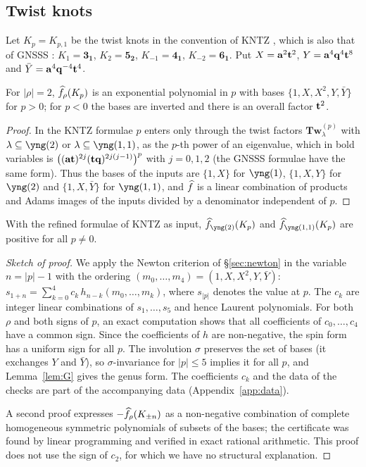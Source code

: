 \subsection{Twist knots}
Let $K_p=K_{p,1}$ be the twist knots in the convention of KNTZ \cite{Kameyama19}, which is also that of GNSSS \cite{Gukov15}:
$K_1=\mathbf{3_1}$, $K_2=\mathbf{5_2}$, $K_{-1}=\mathbf{4_1}$, $K_{-2}=\mathbf{6_1}$.
Put $X=\mathbf{a}^2\mathbf{t}^2$, $Y=\mathbf{a}^4\mathbf{q}^4\mathbf{t}^8$ and $\bar Y=\mathbf{a}^4\mathbf{q}^{-4}\mathbf{t}^4$.
\begin{lemma}\label{lem:twist-expsum}
For $|\rho|=2$, $\widehat{f}_\rho(K_p)$ is an exponential polynomial in $p$ with bases $\{1,X,X^2,Y,\bar Y\}$ for $p>0$;
for $p<0$ the bases are inverted and there is an overall factor $\mathbf{t}^2$.
\end{lemma}
\begin{proof}
In the KNTZ formulae $p$ enters only through the twist factors $\mathbf{Tw}^{(p)}_\lambda$ with $\lambda\subseteq\yng(2)$ or $\lambda\subseteq\yng(1,1)$, as the $p$-th power of an eigenvalue,
which in bold variables is $\bigl((\mathbf{a}\mathbf{t})^{2j}(\mathbf{t}\mathbf{q})^{2j(j-1)}\bigr)^p$ with $j=0,1,2$ (the GNSSS formulae have the same form).
Thus the bases of the inputs are $\{1,X\}$ for $\yng(1)$, $\{1,X,Y\}$ for $\yng(2)$ and $\{1,X,\bar Y\}$ for $\yng(1,1)$,
and $\widehat{f}$ is a linear combination of products and Adams images of the inputs divided by a denominator independent of $p$.
\end{proof}
\begin{theorem}\label{thm:twist}
With the refined formulae of KNTZ as input, $\hf_{\yng(2)}(K_p)$ and $\hf_{\yng(1,1)}(K_p)$ are positive for all $p\neq0$.
\end{theorem}
\begin{proof}[Sketch of proof]
We apply the Newton criterion of \S\ref{sec:newton} in the variable $n=|p|-1$ with the ordering $(m_0,\dots,m_4)=(1,X,X^2,Y,\bar Y)$:
$s_{1+n}=\sum_{k=0}^{4}c_k\,h_{n-k}(m_0,\dots,m_k)$, where $s_{|p|}$ denotes the value at $p$.
The $c_k$ are integer linear combinations of $s_1,\dots,s_5$ and hence Laurent polynomials.
For both $\rho$ and both signs of $p$, an exact computation shows that all coefficients of $c_0,\dots,c_4$ have a common sign.
Since the coefficients of $h$ are non-negative, the spin form has a uniform sign for all $p$.
The involution $\sigma$ preserves the set of bases (it exchanges $Y$ and $\bar Y$), so $\sigma$-invariance for $|p|\le5$ implies it for all $p$, and Lemma~\ref{lem:G} gives the genus form.
The coefficients $c_k$ and the data of the checks are part of the accompanying data (Appendix~\ref{app:data}).

A second proof expresses $-\widehat{f}_\rho(K_{\pm n})$ as a non-negative combination of complete homogeneous symmetric polynomials of subsets of the bases;
the certificate was found by linear programming and verified in exact rational arithmetic. This proof does not use the sign of $c_2$, for which we have no structural explanation.
\end{proof}
